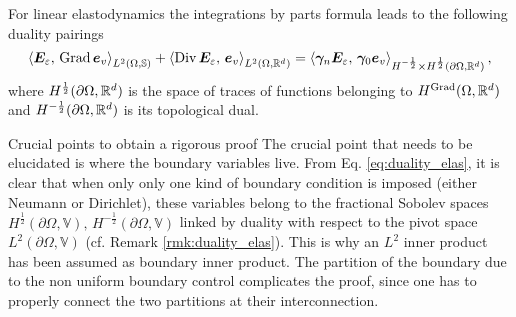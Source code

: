 \begin{remark}\label{rmk:duality_elas}
	For linear elastodynamics the integrations by parts formula leads to the following duality pairings \cite[Chapter 1]{boffi2013mixed}
	\begin{equation}\label{eq:duality_elas}
	\inner[L^2(\Omega, \bbS)]{\bm{E}_\varepsilon}{\Grad \bm{e}_v} + \inner[L^2(\Omega, \bbR^d)]{\Div \bm{E}_\varepsilon}{\bm{e}_v} = \inner[H^{-\frac{1}{2}} \times H^{\frac{1}{2}}(\partial\Omega, \bbR^d)]{\bm\gamma_{n}\bm{E}_\varepsilon}{\bm\gamma_{0} \bm{e}_v},
	\end{equation}
	where $H^{\frac{1}{2}}(\partial\Omega, \bbR^d)$ is the space of traces of functions belonging to $H^{\Grad}(\Omega, \bbR^d)$ and $H^{-\frac{1}{2}}(\partial\Omega, \bbR^d)$ is its topological dual.
\end{remark}

\begin{paragraph}{Crucial points to obtain a rigorous proof}
	The crucial point that needs to be elucidated is where the boundary variables live. From Eq. \eqref{eq:duality_elas}, it is clear that when only only one kind of boundary condition is imposed (either Neumann or Dirichlet), these variables belong to the fractional Sobolev spaces $H^{\frac{1}{2}}(\partial\Omega, \mathbb{V}), \, H^{-\frac{1}{2}}(\partial\Omega, \mathbb{V})$ linked by duality with respect to the pivot space $L^2(\partial\Omega, \mathbb{V})$ (cf. Remark \ref{rmk:duality_elas}). This is why an $L^2$ inner product has been assumed as boundary inner product. The partition of the boundary due to the non uniform boundary control complicates the proof, since one has to properly connect the two partitions at their interconnection.
\end{paragraph}

